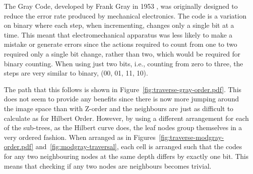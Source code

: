 The Gray Code, developed by Frank Gray in 1953 \cite{gray1953pulse}, was
originally designed to reduce the error rate produced by mechanical
electronics. The code is a variation on binary where each step, when
incrementing, changes only a single bit at a time. This meant that
electromechanical apparatus was less likely to make a mistake or generate
errors since the actions required to count from one to two required only a
single bit change, rather than two, which would be required for binary
counting.  When using just two bits, i.e., counting from zero to three, the
steps are very similar to binary, (00, 01, 11, 10).

The path that this follows is shown in
Figure~\ref{fig:traverse-gray-order.pdf}. This does not seem to provide any
benefits since there is now more jumping around the image space than with
Z-order and the neighbours are just as difficult to calculate as for Hilbert
Order. However, by using a different arrangement for each of the sub-trees, as
the Hilbert curve does, the leaf nodes group themselves in a very ordered
fashion.  When arranged as in Figures~\ref{fig:traverse-modgray-order.pdf}
and~\ref{fig:modgray-traversal}, each cell is arranged such that the codes for
any two neighbouring nodes at the same depth differs by exactly one bit. This
means that checking if any two nodes are neighbours becomes trivial.

